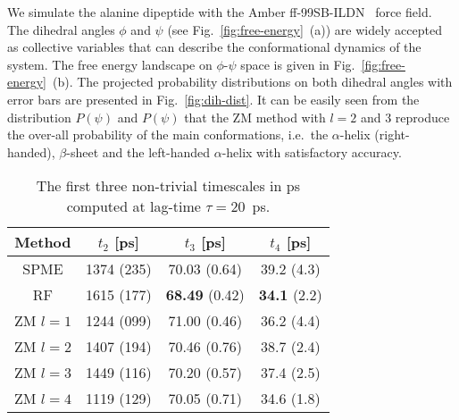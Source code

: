 \documentclass[aip,jcp,a4paper,preprint,unsortedaddress,onecolumn,fleqn]{revtex4-1}
\begin{document}
We simulate the alanine dipeptide with the Amber
ff-99SB-ILDN~\cite{lindorff2010improved} force field.  The dihedral
angles $\phi$ and $\psi$ (see Fig.~\ref{fig:free-energy}~(a)) are
widely accepted as collective variables that can describe the
conformational dynamics of the system.  The free energy landscape
on $\phi$-$\psi$ space is given in Fig.~\ref{fig:free-energy}~(b).  The projected
probability distributions on both dihedral angles
with error bars are presented in Fig.~\ref{fig:dih-dist}. It can be easily seen
from the distribution $P(\psi)$ and $P(\psi)$ that the ZM method with
$l=2$ and 3 reproduce the over-all probability of the main
conformations, i.e.~the $\alpha$-helix (right-handed), $\beta$-sheet and
the left-handed $\alpha$-helix with satisfactory accuracy.



\begin{table}
  \centering
  \caption{The first three non-trivial timescales in ps computed at lag-time $\tau = 20$~ps.
  }
  \begin{tabular*}{0.5\textwidth}{@{\extracolsep{\fill}}c   ccc}\hline\hline
    Method      &        $t_2$ [ps]  & $t_3$ [ps] &  $t_4$ [ps] \\\hline
    SPME        &         1374  (235)     &          70.03  (0.64)  &         39.2  (4.3)    \\
    RF          &        {1615} (177)     &  \textbf{68.49} (0.42)  & \textbf{34.1} (2.2)    \\
    ZM $l=1$    &        {1244} (099)     &         {71.00} (0.46)  &         36.2  (4.4)    \\
    ZM $l=2$    &         1407  (194)     &          70.46  (0.76)  &         38.7  (2.4)    \\
    ZM $l=3$    &         1449  (116)     &          70.20  (0.57)  &         37.4  (2.5)    \\
    ZM $l=4$    &        {1119} (129)     &          70.05  (0.71)  &         34.6  (1.8)    \\
    \hline\hline
  \end{tabular*}
  \label{tab:tmp3}
\end{table}
\end{document}
